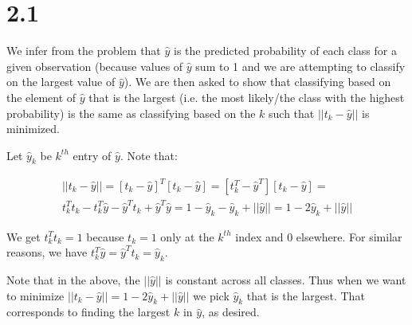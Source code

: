 \section*{2.1}

\noindent
We infer from the problem that $\hat{y}$ is the predicted probability of each 
class for a given observation (because values of $\hat{y}$ sum to 1 and we are 
attempting to classify on the largest value of $\hat{y}$). We are then asked to 
show that classifying based on the element of $\hat{y}$ that is the largest 
(i.e. the most likely/the class with the highest probability) is the same as 
classifying based on the $k$ such that $||t_{k} - \hat{y}||$ is minimized.

\vspace{5mm}
\noindent
Let $\hat{y}_{k}$ be $k^{th}$ entry of $\hat{y}$. Note that:

\begin{gather*}
||t_{k} - \hat{y}|| = 
[t_{k} - \hat{y}]^{T} [t_{k} - \hat{y}] = 
[t_{k}^{T} - \hat{y}^{T}] [t_{k} - \hat{y}] = \\
t_{k}^{T} t_{k} - t_{k}^{T} \hat{y} - \hat{y}^{T} t_{k} + \hat{y}^{T} \hat{y} = 
1 - \hat{y}_{k} - \hat{y}_{k} + ||\hat{y}|| = 
1 - 2 \hat{y}_{k} + ||\hat{y}||
\end{gather*}

\vspace{5mm}
\noindent
We get $t_{k}^{T} t_{k} = 1$ because $t_{k} = 1$ only at the $k^{th}$ index and 
0 elsewhere. For similar reasons, we have 
$t_{k}^{T} \hat{y} = \hat{y}^{T} t_{k} = \hat{y}_{k}$.

\vspace{5mm}
\noindent
Note that in the above, the $||\hat{y}||$ is constant across all classes. Thus 
when we want to minimize 
$||t_{k} - \hat{y}|| = 1 - 2 \hat{y}_{k} + ||\hat{y}||$ we pick 
$\hat{y}_{k}$ that is the largest. That corresponds to finding the largest 
$k$ in $\hat{y}$, as desired.